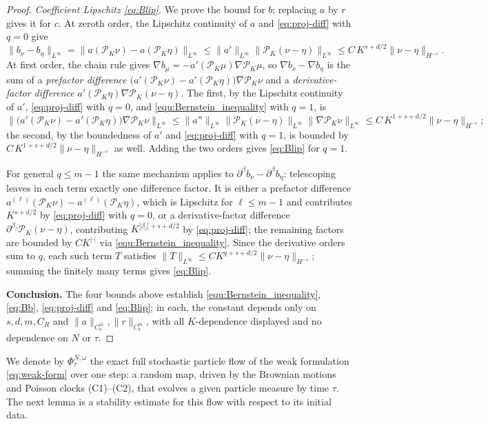 \documentclass[a4paper,fleqn]{cas-sc}
\theoremstyle{definition}
\theoremstyle{remark}
\begin{document}
\begin{proof}
\emph{Coefficient Lipschitz \eqref{eq:Blip}.} We prove the bound for $b$; replacing $a$
by $r$ gives it for $c$. At zeroth order, the Lipschitz continuity of $a$ and
\eqref{eq:proj-diff} with $q=0$ give
\[
\|b_\nu-b_\eta\|_{L^\infty}
=\|a(\mathcal P_K\nu)-a(\mathcal P_K\eta)\|_{L^\infty}
\le\|a'\|_{L^\infty}\|\mathcal P_K(\nu-\eta)\|_{L^\infty}
\le C\,K^{s+d/2}\|\nu-\eta\|_{H^{-s}}.
\]
At first order, the chain rule gives $\nabla b_\mu=-a'(\mathcal P_K\mu)\nabla\mathcal P_K\mu$,
so $\nabla b_\nu-\nabla b_\eta$ is the sum of a \emph{prefactor difference}
$\bigl(a'(\mathcal P_K\nu)-a'(\mathcal P_K\eta)\bigr)\nabla\mathcal P_K\nu$ and a
\emph{derivative-factor difference} $a'(\mathcal P_K\eta)\nabla\mathcal P_K(\nu-\eta)$. The
first, by the Lipschitz continuity of $a'$, \eqref{eq:proj-diff} with $q=0$, and
\eqref{equ:Bernstein_inequality} with $q=1$, is
\[
\bigl\|\bigl(a'(\mathcal P_K\nu)-a'(\mathcal P_K\eta)\bigr)\nabla\mathcal P_K\nu\bigr\|_{L^\infty}
\le\|a''\|_{L^\infty}\|\mathcal P_K(\nu-\eta)\|_{L^\infty}\|\nabla\mathcal P_K\nu\|_{L^\infty}
\le C\,K^{1+s+d/2}\|\nu-\eta\|_{H^{-s}};
\]
the second, by the boundedness of $a'$ and \eqref{eq:proj-diff} with $q=1$, is bounded by
$C\,K^{1+s+d/2}\|\nu-\eta\|_{H^{-s}}$ as well. Adding the two orders gives \eqref{eq:Blip}
for $q=1$.

For general $q\le m-1$ the same mechanism applies to
$\partial^\beta b_\nu-\partial^\beta b_\eta$: telescoping leaves in each term exactly one
difference factor. It is either a prefactor difference
$a^{(\ell)}(\mathcal P_K\nu)-a^{(\ell)}(\mathcal P_K\eta)$, which is Lipschitz for
$\ell\le m-1$ and contributes $K^{s+d/2}$ by \eqref{eq:proj-diff} with $q=0$, or a
derivative-factor difference $\partial^{\beta_\ell}\mathcal P_K(\nu-\eta)$, contributing
$K^{|\beta_\ell|+s+d/2}$ by \eqref{eq:proj-diff}; the remaining factors are bounded by
$CK^{|\cdot|}$ via \eqref{equ:Bernstein_inequality}. Since the derivative orders sum to
$q$, each such term $T$ satisfies $\|T\|_{L^\infty}\le CK^{q+s+d/2}\|\nu-\eta\|_{H^{-s}}$;
summing the finitely many terms gives \eqref{eq:Blip}.

\textbf{Conclusion.} The four bounds above establish \eqref{equ:Bernstein_inequality},
\eqref{eq:Bb}, \eqref{eq:proj-diff} and \eqref{eq:Blip}; in each, the constant
depends only on $s,d,m,C_R$ and $\|a\|_{C^m_b},\|r\|_{C^m_b}$, with all
$K$-dependence displayed and no dependence on $N$ or $\tau$.
\end{proof}

We denote by $\Phi^{N,\omega}_\tau$ the exact full stochastic particle flow of the
weak formulation \eqref{eq:weak-form} over one step: a random map, driven by the
Brownian motions and Poisson clocks (C1)--(C2), that evolves a given particle
measure by time $\tau$. The next lemma is a stability estimate for this flow with
respect to its initial data.
\end{document}
